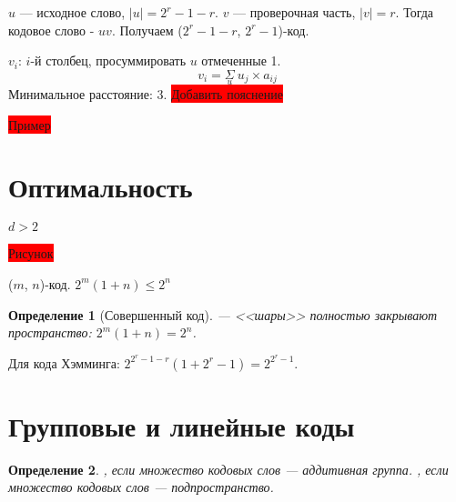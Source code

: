 \documentclass[a4paper,14pt, draft]{report}
\newtheorem{definition}{Определение}
\begin{document}
$u$ --- исходное слово, $|u| = 2^r-1-r$. $v$ --- проверочная часть, $|v| = r$. Тогда кодовое слово - $uv$. Получаем ($2^r-1-r$, $2^r-1$)-код.

$v_i$: $i$-й столбец, просуммировать $u$ отмеченные 1. $$v_i = \underset{u}{\Sigma}~u_j\times a_{ij}$$
Минимальное расстояние: 3. \colorbox{red}{Добавить пояснение}

\colorbox{red}{Пример}

\section{Оптимальность}

$d > 2$

\colorbox{red}{Рисунок}

($m$, $n$)-код. $2^m (1+n) \le 2^n$
\begin{definition}[Совершенный код]
 --- <<шары>> полностью закрывают пространство: $2^m (1+n) = 2^n$.
\end{definition}

Для кода Хэмминга: $2^{2^r-1-r}(1+2^r-1) = 2^{2^r-1}.$

\section{Групповые и линейные коды}
\begin{definition}
, если множество кодовых слов --- аддитивная группа. , если множество кодовых слов --- подпространство.
\end{definition}
\end{document}
